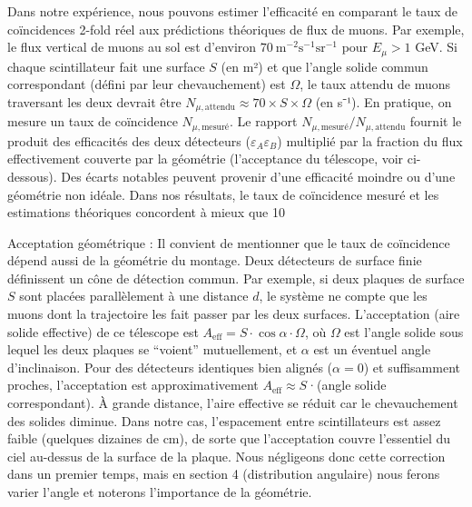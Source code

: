 \documentclass[a4paper,12pt,twoside]{article}
\begin{document}
Dans notre expérience, nous pouvons estimer l’efficacité en comparant le taux de coïncidences 2-fold réel aux prédictions théoriques de flux de muons. Par exemple, le flux vertical de muons au sol est d’environ $70~\text{m}^{-2}\text{s}^{-1}\text{sr}^{-1}$ pour $E_\mu > 1$ GeV. Si chaque scintillateur fait une surface $S$ (en m²) et que l’angle solide commun correspondant (défini par leur chevauchement) est $\Omega$, le taux attendu de muons traversant les deux devrait être $N_{\mu,\text{attendu}} \approx 70 \times S \times \Omega$ (en s⁻¹). En pratique, on mesure un taux de coïncidence $N_{\mu,\text{mesuré}}$. Le rapport $N_{\mu,\text{mesuré}} / N_{\mu,\text{attendu}}$ fournit le produit des efficacités des deux détecteurs ($\varepsilon_A \varepsilon_B$) multiplié par la fraction du flux effectivement couverte par la géométrie (l’acceptance du télescope, voir ci-dessous). Des écarts notables peuvent provenir d’une efficacité moindre ou d’une géométrie non idéale. Dans nos résultats, le taux de coïncidence mesuré et les estimations théoriques concordent à mieux que 10%

Acceptation géométrique : Il convient de mentionner que le taux de coïncidence dépend aussi de la géométrie du montage. Deux détecteurs de surface finie définissent un cône de détection commun. Par exemple, si deux plaques de surface $S$ sont placées parallèlement à une distance $d$, le système ne compte que les muons dont la trajectoire les fait passer par les deux surfaces. L’acceptation (aire solide effective) de ce télescope est $A_{\text{eff}} = S \cdot \cos\alpha \cdot \Omega$, où $\Omega$ est l’angle solide sous lequel les deux plaques se “voient” mutuellement, et $\alpha$ est un éventuel angle d’inclinaison. Pour des détecteurs identiques bien alignés ($\alpha=0$) et suffisamment proches, l’acceptation est approximativement $A_{\text{eff}} \approx S$·(angle solide correspondant). À grande distance, l’aire effective se réduit car le chevauchement des solides diminue. Dans notre cas, l’espacement entre scintillateurs est assez faible (quelques dizaines de cm), de sorte que l’acceptation couvre l’essentiel du ciel au-dessus de la surface de la plaque. Nous négligeons donc cette correction dans un premier temps, mais en section 4 (distribution angulaire) nous ferons varier l’angle et noterons l’importance de la géométrie.
\end{document}
